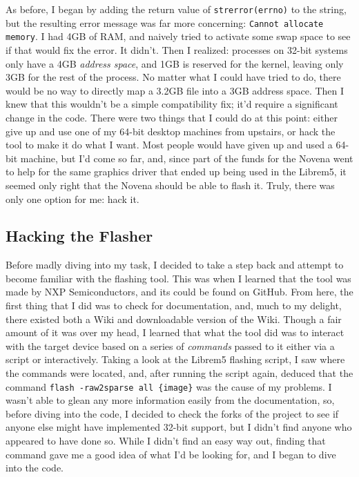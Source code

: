 \documentclass{article}
\begin{document}
As before, I began by adding the return value of \texttt{strerror(errno)} to the string, but the resulting error message was far more concerning: \texttt{Cannot allocate memory}.  I had 4GB of RAM, and naively tried to activate some swap space to see if that would fix the error.  It didn't.  Then I realized: processes on 32-bit systems only have a 4GB \emph{address space}, and 1GB is reserved for the kernel, leaving only 3GB for the rest of the process.  No matter what I could have tried to do, there would be no way to directly map a 3.2GB file into a 3GB address space.  Then I knew that this wouldn't be a simple compatibility fix; it'd require a significant change in the code.  There were two things that I could do at this point: either give up and use one of my 64-bit desktop machines from upstairs, or hack the tool to make it do what I want.  Most people would have given up and used a 64-bit machine, but I'd come so far, and, since part of the funds for the Novena went to help  for the same graphics driver that ended up being used in the Librem5, it seemed only right that the Novena should be able to flash it.  Truly, there was only one option for me: hack it.

\subsection{Hacking the Flasher}
Before madly diving into my task, I decided to take a step back and attempt to become familiar with the flashing tool.  This was when I learned that the tool was made by NXP Semiconductors, and its  could be found on GitHub.  From here, the first thing that I did was to check for documentation, and, much to my delight, there existed both a Wiki and downloadable  version of the Wiki.  Though a fair amount of it was over my head, I learned that what the tool did was to interact with the target device based on a series of \emph{commands} passed to it either via a script or interactively.  Taking a look at the Librem5 flashing script, I saw where the commands were located, and, after running the script again, deduced that the command \verb|flash -raw2sparse all {image}| was the cause of my problems.  I wasn't able to glean any more information easily from the documentation, so, before diving into the code, I decided to check the forks of the project to see if anyone else might have implemented 32-bit support, but I didn't find anyone who appeared to have done so.  While I didn't find an easy way out, finding that command gave me a good idea of what I'd be looking for, and I began to dive into the code.
\end{document}
